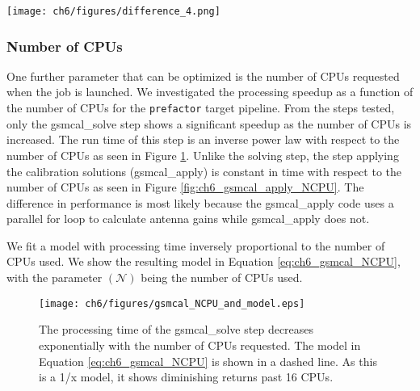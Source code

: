 \begin{figure*}
    \texttt{[image: ch6/figures/difference\_4.png]}
      \caption{Four images made using the \texttt{wsclean} software \citep{wsclean} from the data set\protect\footnotemark. The four images were calibrated with sky models of various flux cutoffs ranging from 0.05Jy (top left) to 1.5Jy (bottom right). Flux statistics for the green regions in the four images are listed in Table \ref{table:skymodel_RMS}. The top right, and bottom two quadrants show the pixel difference between the 0.05Jy image and the 0.3Jy, 0.8Jy and 1.5Jy images respectively. The four images are all on the same scaleThe green region shows the same area in all four quadrants.  }
	\label{fig:ch6_skymodel_images}
\end{figure*}



\subsubsection{Number of CPUs}
One further parameter that can be optimized is the number of CPUs requested when the job is launched. We investigated the processing speedup as a function of the number of CPUs for the \texttt{prefactor} target pipeline. From the steps tested, only the {\selectfont gsmcal\_solve} step shows a significant speedup as the number of CPUs is increased. The run time of this step is an inverse power law with respect to the number of CPUs as seen in Figure \ref{fig:ch6_gsmcal_solve_NCPU}. Unlike the solving step, the step applying the calibration solutions ({\selectfont gsmcal\_apply}) is constant in time with respect to the number of CPUs as seen in Figure \ref{fig:ch6_gsmcal_apply_NCPU}. The difference in performance is most likely because the {\selectfont gsmcal\_apply} code uses a parallel for loop to calculate antenna gains while {\selectfont gsmcal\_apply} does not. 

We fit a model with processing time inversely proportional to the number of CPUs used. We show the resulting model in Equation \ref{eq:ch6_gsmcal_NCPU}, with the parameter $(\mathcal{N})$ being the number of CPUs used. 

\begin{figure}
    \texttt{[image: ch6/figures/gsmcal\_NCPU\_and\_model.eps]}
      \caption{The processing time of the {\selectfont gsmcal\_solve} step decreases exponentially with the number of CPUs requested. The model in Equation \ref{eq:ch6_gsmcal_NCPU} is shown in a dashed line. As this is a 1/x model, it shows diminishing returns past 16 CPUs. }
	\label{fig:ch6_gsmcal_solve_NCPU}
\end{figure}

